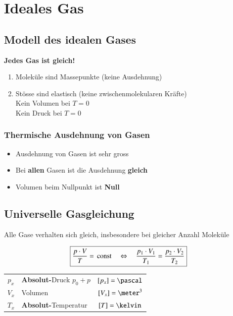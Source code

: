 
\section{Ideales Gas}

\subsection{Modell des idealen Gases}

\textbf{Jedes Gas ist gleich!}

\medskip

\begin{enumerate}
	\item Moleküle sind Massepunkte (keine Ausdehnung)
	\item Stösse sind elastisch (keine zwischenmolekularen Kräfte) \\
		Kein Volumen bei $T = 0$ \\
		Kein Druck bei $T = 0$
\end{enumerate}


\subsubsection{Thermische Ausdehnung von Gasen}

\begin{itemize}
	\item Ausdehnung von Gasen ist sehr gross
	\item Bei \textbf{allen} Gasen ist die Ausdehnung \textbf{gleich}
	\item Volumen beim Nullpunkt ist \textbf{Null} 
\end{itemize}


\subsection{Universelle Gasgleichung}

Alle Gase verhalten sich gleich, insbesondere bei gleicher Anzahl Moleküle

$$ \boxed{ \frac{p \cdot V}{T} = \, \mathop{} \! \mathrm{const} \quad \Leftrightarrow \quad \frac{p_1 \cdot V_1}{T_1} = \frac{p_2 \cdot V_2}{T_2} } $$ 

\begin{tabular}{c l c}
	$p_x$ & \textbf{Absolut-}Druck $p_0 + p$ 	& $[p_x] = \pascal$ 	\\
	$V_x$ & Volumen 							& $[V_x] = \meter^3$ 	\\
	$T_x$ & \textbf{Absolut-}Temperatur			& $[T] = \kelvin$
\end{tabular}
	
